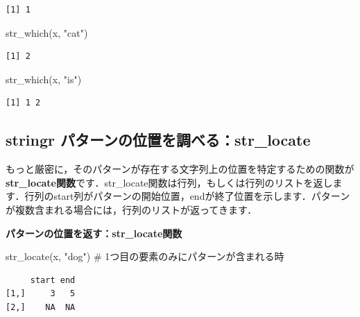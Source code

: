 \documentclass[
  letterpaper,
  DIV=11,
  numbers=noendperiod]{scrreprt}
\newenvironment{Shaded}{\begin{snugshade}}{\end{snugshade}}
\newcommand{\CommentTok}[1]{\textcolor[rgb]{0.37,0.37,0.37}{#1}}
\newcommand{\FunctionTok}[1]{\textcolor[rgb]{0.28,0.35,0.67}{#1}}
\newcommand{\NormalTok}[1]{\textcolor[rgb]{0.00,0.23,0.31}{#1}}
\newcommand{\StringTok}[1]{\textcolor[rgb]{0.13,0.47,0.30}{#1}}
\begin{document}
\begin{verbatim}
[1] 1
\end{verbatim}

\begin{Shaded}
\begin{Highlighting}[]
\FunctionTok{str\_which}\NormalTok{(x, }\StringTok{"cat"}\NormalTok{)}
\end{Highlighting}
\end{Shaded}

\begin{verbatim}
[1] 2
\end{verbatim}

\begin{Shaded}
\begin{Highlighting}[]
\FunctionTok{str\_which}\NormalTok{(x, }\StringTok{"is"}\NormalTok{)}
\end{Highlighting}
\end{Shaded}

\begin{verbatim}
[1] 1 2
\end{verbatim}

\hypertarget{stringr-ux30d1ux30bfux30fcux30f3ux306eux4f4dux7f6eux3092ux8abfux3079ux308bstr_locate}{%
\subsection{stringr
パターンの位置を調べる：str\_locate}\label{stringr-ux30d1ux30bfux30fcux30f3ux306eux4f4dux7f6eux3092ux8abfux3079ux308bstr_locate}}

もっと厳密に，そのパターンが存在する文字列上の位置を特定するための関数が\textbf{str\_locate関数}です．str\_locate関数は行列，もしくは行列のリストを返します．行列のstart列がパターンの開始位置，endが終了位置を示します．パターンが複数含まれる場合には，行列のリストが返ってきます．

\textbf{パターンの位置を返す：str\_locate関数}

\begin{Shaded}
\begin{Highlighting}[]
\FunctionTok{str\_locate}\NormalTok{(x, }\StringTok{"dog"}\NormalTok{) }\CommentTok{\# 1つ目の要素のみにパターンが含まれる時}
\end{Highlighting}
\end{Shaded}

\begin{verbatim}
     start end
[1,]     3   5
[2,]    NA  NA
\end{verbatim}
\end{document}
